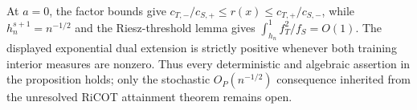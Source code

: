 At \(a=0\), the factor bounds give \(c_{T,-}/c_{S,+}\le r(x)\le c_{T,+}/c_{S,-}\), while \(h_n^{s+1}=n^{-1/2}\) and the Riesz-threshold lemma gives \(\int_{h_n}^1f_T^2/f_S=O(1)\). The displayed exponential dual extension is strictly positive whenever both training interior measures are nonzero. Thus every deterministic and algebraic assertion in the proposition holds; only the stochastic \(O_P(n^{-1/2})\) consequence inherited from the unresolved RiCOT attainment theorem remains open.